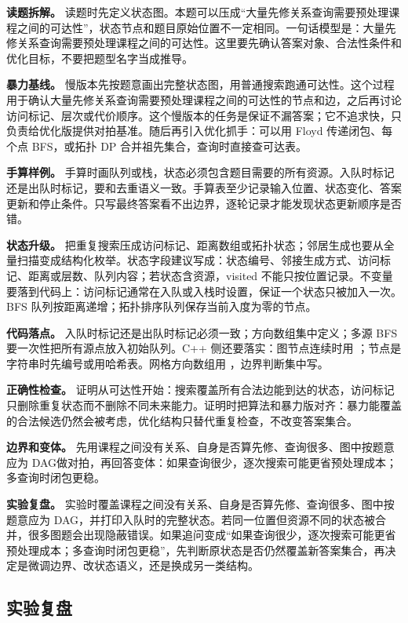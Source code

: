 \textbf{读题拆解。} 读题时先定义状态图。本题可以压成“大量先修关系查询需要预处理课程之间的可达性”，状态节点和题目原始位置不一定相同。一句话模型是：大量先修关系查询需要预处理课程之间的可达性。这里要先确认答案对象、合法性条件和优化目标，不要把题型名字当成推导。

\textbf{暴力基线。} 慢版本先按题意画出完整状态图，用普通搜索跑通可达性。这个过程用于确认大量先修关系查询需要预处理课程之间的可达性的节点和边，之后再讨论访问标记、层次或代价顺序。这个慢版本的任务是保证不漏答案；它不追求快，只负责给优化版提供对拍基准。随后再引入优化抓手：可以用 Floyd 传递闭包、每个点 BFS，或拓扑 DP 合并祖先集合，查询时直接查可达表。

\textbf{手算样例。} 手算时画队列或栈，状态必须包含题目需要的所有资源。入队时标记还是出队时标记，要和去重语义一致。手算表至少记录输入位置、状态变化、答案更新和停止条件。只写最终答案看不出边界，逐轮记录才能发现状态更新顺序是否错。

\textbf{状态升级。} 把重复搜索压成访问标记、距离数组或拓扑状态；邻居生成也要从全量扫描变成结构化枚举。状态字段建议写成：状态编号、邻接生成方式、访问标记、距离或层数、队列内容；若状态含资源，visited 不能只按位置记录。不变量要落到代码上：访问标记通常在入队或入栈时设置，保证一个状态只被加入一次。BFS 队列按距离递增；拓扑排序队列保存当前入度为零的节点。

\textbf{代码落点。} 入队时标记还是出队时标记必须一致；方向数组集中定义；多源 BFS 要一次性把所有源点放入初始队列。C++ 侧还要落实：图节点连续时用 ；节点是字符串时先编号或用哈希表。网格方向数组用 ，边界判断集中写。

\textbf{正确性检查。} 证明从可达性开始：搜索覆盖所有合法边能到达的状态，访问标记只删除重复状态而不删除不同未来能力。证明时把算法和暴力版对齐：暴力能覆盖的合法候选仍然会被考虑，优化结构只替代重复检查，不改变答案集合。

\textbf{边界和变体。} 先用课程之间没有关系、自身是否算先修、查询很多、图中按题意应为 DAG做对拍，再回答变体：如果查询很少，逐次搜索可能更省预处理成本；多查询时闭包更稳。

\textbf{实验复盘。} 实验时覆盖课程之间没有关系、自身是否算先修、查询很多、图中按题意应为 DAG，并打印入队时的完整状态。若同一位置但资源不同的状态被合并，很多图题会出现隐蔽错误。如果追问变成“如果查询很少，逐次搜索可能更省预处理成本；多查询时闭包更稳”，先判断原状态是否仍然覆盖新答案集合，再决定是微调边界、改状态语义，还是换成另一类结构。

\subsection{实验复盘}

